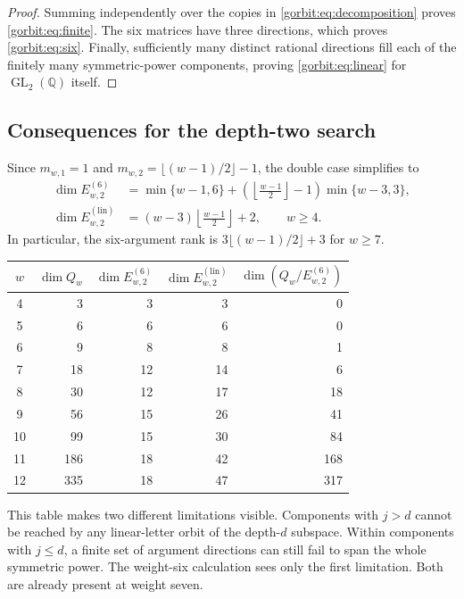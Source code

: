 \begin{proof}
Summing independently over the copies in \eqref{gorbit:eq:decomposition}
proves \eqref{gorbit:eq:finite}. The six matrices have three directions,
which proves \eqref{gorbit:eq:six}. Finally, sufficiently many distinct
rational directions fill each of the finitely many symmetric-power
components, proving \eqref{gorbit:eq:linear} for
$\operatorname{GL}_2(\mathbb Q)$ itself.
\end{proof}

\subsection{Consequences for the depth-two search}

Since $m_{w,1}=1$ and
$m_{w,2}=\lfloor(w-1)/2\rfloor-1$, the double case simplifies to
\begin{align}
 \dim E^{(6)}_{w,2}
 &=\min\{w-1,6\}
  +\left(\left\lfloor\frac{w-1}{2}\right\rfloor-1\right)
                           \min\{w-3,3\},\label{gorbit:eq:double-six}\\
 \dim E^{(\mathrm{lin})}_{w,2}
 &=(w-3)\left\lfloor\frac{w-1}{2}\right\rfloor+2,
 \qquad w\ge4.\label{gorbit:eq:double-linear}
\end{align}
In particular, the six-argument rank is
$3\lfloor(w-1)/2\rfloor+3$ for $w\ge7$.

\begin{center}
\begin{tabular}{c|rrrr}
$w$&$\dim Q_w$&$\dim E^{(6)}_{w,2}$&
 $\dim E^{(\mathrm{lin})}_{w,2}$&$\dim(Q_w/E^{(6)}_{w,2})$\\\hline
4&3&3&3&0\\
5&6&6&6&0\\
6&9&8&8&1\\
7&18&12&14&6\\
8&30&12&17&18\\
9&56&15&26&41\\
10&99&15&30&84\\
11&186&18&42&168\\
12&335&18&47&317
\end{tabular}
\end{center}

This table makes two different limitations visible. Components with
$j>d$ cannot be reached by any linear-letter orbit of the depth-$d$
subspace. Within components with $j\le d$, a finite set of argument
directions can still fail to span the whole symmetric power. The
weight-six calculation sees only the first limitation. Both are already
present at weight seven.

